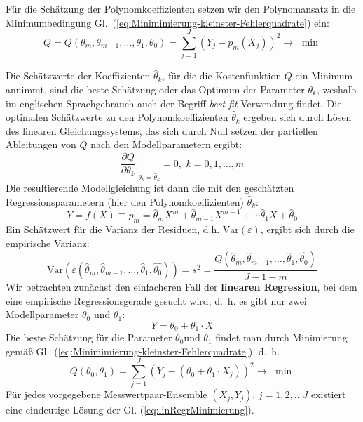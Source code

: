 Für die Schätzung der Polynomkoeffizienten setzen wir den Polynomansatz in die
Minimumbedingung Gl.~(\ref{eq:Minimimierung-kleinster-Fehlerquadrate}) ein:
\begin{equation}
Q = Q(\theta _m ,\theta _{m - 1} ,\ldots ,\theta _1 ,\theta _0 ) =
\sum\limits_{j = 1}^J {(Y_j - p_m (X_j ))^2 \to } \,\,\min
\end{equation}

Die Schätzwerte der Koeffizienten $\hat{\theta}_k$, für die die Kostenfunktion $Q$ ein Minimum annimmt, sind
die beste Schätzung oder das Optimum der Parameter $\theta _k $, weshalb im englischen Sprachgebrauch auch der Begriff
\textsl{best fit} Verwendung findet. Die optimalen Schätzwerte zu den
Polynomkoeffizienten $\hat{\theta}_k$ ergeben sich durch Lösen des linearen Gleichungssystems,
das sich durch Null setzen der partiellen Ableitungen von $Q$ nach den Modellparametern ergibt:
\begin{equation}
\left. {\frac{\partial Q}{\partial \theta _k }} \right|_{\theta_k
	=  \hat\theta_k } = 0,\,\,k = 0,1,\ldots ,m
\label{linRegGleichungssystem}
\end{equation}
Die resultierende Modellgleichung ist dann die mit den geschätzten
Regressionsparametern (hier den Polynomkoeffizienten) $\hat\theta_k$:
\begin{equation}
Y = f(X) \equiv p_m = \hat\theta_m X ^m + \hat\theta_{m - 1} X
^{m - 1} + \cdots \hat\theta_1 X + \hat\theta_0
\end{equation}
Ein Schätzwert für die Varianz der Residuen, d.h.
$\mathrm{Var}(\varepsilon)$, ergibt sich durch die empirische Varianz:
\begin{equation}
\mathrm{Var}(\varepsilon(\hat{\theta}_m ,\hat{\theta}_{m - 1} ,\ldots ,\hat{\theta}_1
,\hat{\theta_0} )) = s^2 = \frac{Q(\hat{\theta}_m ,\hat{\theta}_{m - 1}
	,\ldots ,\hat{\theta}_1 ,\hat{\theta_0} )}{J - 1 - m}
\label{eq:s_quadrat_Regresssion}
\end{equation}
Wir betrachten zunächst den einfacheren Fall der \textbf{linearen Regression},
bei dem eine empirische Regressionsgerade  gesucht wird, d.~h.
es gibt nur zwei Modellparameter $\theta_0$ und $\theta_1$:
\begin{equation}
Y = \theta_0 + \theta_1 \cdot X
\end{equation}
Die beste Schätzung für die Parameter $\theta _0 $und
$\theta _1 $ findet man durch Minimierung gemäß
Gl.~(\ref{eq:Minimimierung-kleinster-Fehlerquadrate}),
d.~h.
\begin{equation}
\label{eq:linRegrMinimierung}
Q(\theta _0 ,\theta _1 ) = \sum\limits_{j = 1}^J {(Y_j
	- (\theta _0 + \theta _1 \cdot X_j))^2 \to } \,\,\min
\end{equation}
Für jedes vorgegebene Messwertpaar-Ensemble $(X_j ,Y_j )$, $j
= 1,2,\ldots J$ existiert eine eindeutige Lösung der Gl.
(\ref{eq:linRegrMinimierung}).

